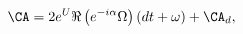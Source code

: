 \begin{equation}
 \CA = 2 e^U \Re \left(e^{-i \alpha} \Omega\right) (dt + \omega) + \CA_d,
  \label{bpsmc3}
\end{equation}

